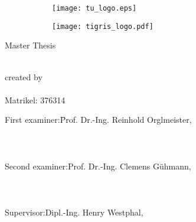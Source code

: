 \begin{titlepage}
\begin{centering}
	\begin{figure}[!h]
		\centering
		\begin{subfigure}{.45\textwidth}
			\texttt{[image: tu\_logo.eps]}
		\end{subfigure}
		\begin{subfigure}{.45\textwidth}
			\centering
			\texttt{[image: tigris\_logo.pdf]}
		\end{subfigure}
	\end{figure}


	\vspace{10mm}

	\LARGE

	Master Thesis

	\textbf{\Title}\\[1cm]


	\large
	created by\\
	\Author\\
	Matrikel: 376314\\[1cm]

	\hspace*{-1.5cm}
	\begin{minipage}{\linewidth}
		\begin{tabbing}
    	First examiner:\qquad \= Prof. Dr.-Ing. Reinhold Orglmeister,\\
			\\
			\\
			\\
    	Second examiner:\>Prof. Dr.-Ing. Clemens Gühmann,\\
			\\
			\\
			\\
    	Supervisor:\>Dipl.-Ing. Henry Westphal,\\
  	\end{tabbing}
  \end{minipage}

	\vspace{20mm}

	\normalsize

	\Date\\
\end{centering}
\end{titlepage}
